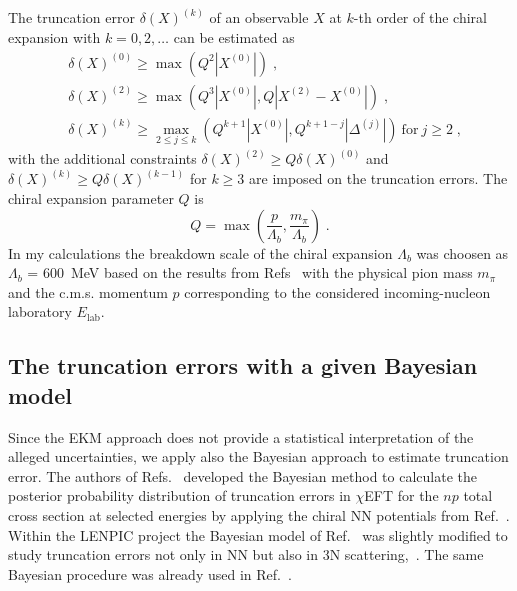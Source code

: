 The truncation error $\delta (X)^{(k)}$ of an observable $X$ at $k$-th order of the chiral expansion with $k = 0, 2, \ldots$ can be estimated as
\begin{equation}
\begin{split}
&\delta (X)^{(0)} \geq \max\left(Q^{2}|X^{(0)}|\right)\;,\\
&\delta (X)^{(2)} \geq \max\left(Q^{3}|X^{(0)}|, Q|X^{(2)} - X^{(0)}|\right)\;,\\
&\delta (X)^{(k)} \geq \max\limits_{2\leq j \leq k}\left(Q^{k+1}|X^{(0)}|, Q^{k+1-j}|\Delta^{(j)}|\right)~\mathrm{for}~j \geq 2\;,
\end{split}
\label{eq:trunc2}
\end{equation}
with the additional constraints $\delta (X)^{(2)} \geq Q\delta (X)^{(0)}$ and $\delta (X)^{(k)} \geq Q\delta (X)^{(k - 1)}$ for $k \geq 3$ are imposed on the truncation errors. 
The chiral expansion parameter $Q$ is
\begin{equation}
Q = \max\left(\frac{p}{\Lambda_{b}}, \frac{m_{\pi}}{\Lambda_{b}}\right)\;.
\label{eq:trunc3}
\end{equation}
In my calculations the breakdown scale of the chiral expansion $\Lambda_{b}$ was choosen as $\Lambda_{b}$ = 600~MeV based on the results from Refs~\cite{binder2016few, binder2018few} with the physical pion mass $m_{\pi}$ and the c.m.s. momentum $p$ corresponding to the considered incoming-nucleon laboratory $E_{\mathrm{lab}}$.
\subsection{The truncation errors with a given Bayesian model}
\label{bayes}
Since the EKM approach does not provide a statistical interpretation of the alleged uncertainties, we apply also the Bayesian approach to estimate truncation error. The authors of Refs.~\cite{Furnstahl2015, melendez2017bayesian} developed the Bayesian method to calculate the posterior probability distribution of truncation errors in $\chi$EFT for the $np$ total cross section at selected energies by applying the chiral NN potentials from Ref.~\cite{Epelbaum2015}. Within the LENPIC project the Bayesian model of Ref.~\cite{melendez2017bayesian} was slightly modified to study truncation errors not only in NN but also in 3N scattering,~\cite{epelbaum2020towards}. The same Bayesian procedure was already used in Ref.~\cite{volkotrub2020uncertainty}.

